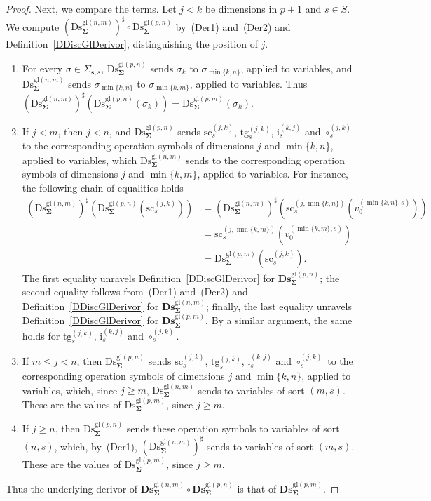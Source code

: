 \documentclass[a4paper, reqno
]{amsart}
\newcommand{\sig}[1]{\mathbf{#1}}             %
\newcommand{\gl}{\mathrm{gl}}                %
\newcommand{\src}{\mathrm{sc}}
\newcommand{\tgt}{\mathrm{tg}}
\newcommand{\Ds}{\mathrm{Ds}}
\newcommand{\bDs}{\mathbf{Ds}}
\theoremstyle{plain}
\theoremstyle{definition}
\begin{document}
\begin{proof}
Next, we compare the terms.
Let $j<k$ be dimensions in $p+1$ and $s\in S$.
We compute $(\Ds^{\gl(n,m)}_{\sig{\Sigma}})^{\sharp}\circ\Ds^{\gl(p,n)}_{\sig{\Sigma}}$ by~(Der1) and~(Der2) and Definition~\ref{DDiscGlDerivor}, distinguishing the position of $j$.
\begin{enumerate}
\item For every $\sigma\in\Sigma_{\mathbf{s},s}$, $\Ds^{\gl(p,n)}_{\sig{\Sigma}}$ sends $\sigma_{k}$ to $\sigma_{\min\{k,n\}}$, applied to variables, and $\Ds^{\gl(n,m)}_{\sig{\Sigma}}$ sends $\sigma_{\min\{k,n\}}$ to $\sigma_{\min\{k,m\}}$, applied to variables.
Thus $(\Ds^{\gl(n,m)}_{\sig{\Sigma}})^{\sharp}(\Ds^{\gl(p,n)}_{\sig{\Sigma}}(\sigma_{k}))=\Ds^{\gl(p,m)}_{\sig{\Sigma}}(\sigma_{k})$.
\item If $j<m$, then $j<n$, and $\Ds^{\gl(p,n)}_{\sig{\Sigma}}$ sends $\src^{(j,k)}_{s}$, $\tgt^{(j,k)}_{s}$, $\mathrm{i}^{(k,j)}_{s}$ and $\circ^{(j,k)}_{s}$ to the corresponding operation symbols of dimensions $j$ and $\min\{k,n\}$, applied to variables, which $\Ds^{\gl(n,m)}_{\sig{\Sigma}}$ sends to the corresponding operation symbols of dimensions $j$ and $\min\{k,m\}$, applied to variables.
For instance, the following chain of equalities holds
\begin{align*}
\left(\Ds^{\gl(n,m)}_{\sig{\Sigma}}\right)^{\sharp}\left(\Ds^{\gl(p,n)}_{\sig{\Sigma}}\left(\src^{(j,k)}_{s}\right)\right)
&=
\left(\Ds^{\gl(n,m)}_{\sig{\Sigma}}\right)^{\sharp}\left(\src^{(j,\min\{k,n\})}_{s}\left(v^{(\min\{k,n\},s)}_{0}\right)\right)
\tag{1}
\\&=
\src^{(j,\min\{k,m\})}_{s}\left(v^{(\min\{k,m\},s)}_{0}\right)
\tag{2}
\\&=
\Ds^{\gl(p,m)}_{\sig{\Sigma}}\left(\src^{(j,k)}_{s}\right).
\tag{3}
\end{align*}
The first equality unravels Definition~\ref{DDiscGlDerivor} for $\bDs^{\gl(p,n)}_{\sig{\Sigma}}$; the second equality follows from~(Der1) and~(Der2) and Definition~\ref{DDiscGlDerivor} for $\bDs^{\gl(n,m)}_{\sig{\Sigma}}$; finally, the last equality unravels Definition~\ref{DDiscGlDerivor} for $\bDs^{\gl(p,m)}_{\sig{\Sigma}}$.
By a similar argument, the same holds for $\tgt^{(j,k)}_{s}$, $\mathrm{i}^{(k,j)}_{s}$ and $\circ^{(j,k)}_{s}$.
\item If $m\leq j<n$, then $\Ds^{\gl(p,n)}_{\sig{\Sigma}}$ sends $\src^{(j,k)}_{s}$, $\tgt^{(j,k)}_{s}$, $\mathrm{i}^{(k,j)}_{s}$ and $\circ^{(j,k)}_{s}$ to the corresponding operation symbols of dimensions $j$ and $\min\{k,n\}$, applied to variables, which, since $j\geq m$, $\Ds^{\gl(n,m)}_{\sig{\Sigma}}$ sends to variables of sort $(m,s)$.
These are the values of $\Ds^{\gl(p,m)}_{\sig{\Sigma}}$, since $j\geq m$.
\item If $j\geq n$, then $\Ds^{\gl(p,n)}_{\sig{\Sigma}}$ sends these operation symbols to variables of sort $(n,s)$, which, by~(Der1), $(\Ds^{\gl(n,m)}_{\sig{\Sigma}})^{\sharp}$ sends to variables of sort $(m,s)$.
These are the values of $\Ds^{\gl(p,m)}_{\sig{\Sigma}}$, since $j\geq m$.
\end{enumerate}
Thus the underlying derivor of $\bDs^{\gl(n,m)}_{\sig{\Sigma}}\circ\bDs^{\gl(p,n)}_{\sig{\Sigma}}$ is that of $\bDs^{\gl(p,m)}_{\sig{\Sigma}}$.


\end{proof}
\end{document}
